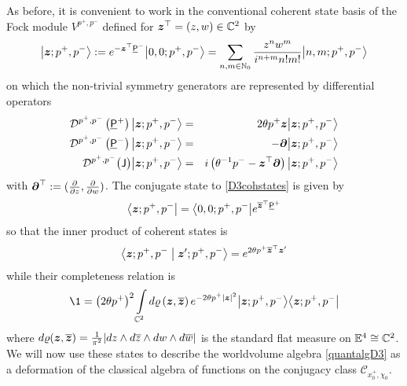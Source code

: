 As before, it is convenient to work in the conventional coherent state basis of
the Fock module $V^{p^+,p^-}$ defined for ${{\boldsymbol {z} }}^\top=(z,w)\in{\mathbb C}^2$ by
\begin{equation}
  \label{D3cohstates}
  \bigl|{{\boldsymbol {z} }};p^+,p^-\bigr\rangle:= e^{-{{\boldsymbol {z} }}^\top \underline{\sf P}{}^-}
  \bigl|0,0;p^+,p^-\bigr\rangle=\sum_{n,m\in{\mathbb N}_0}
  \frac{z^n w^m}{ i^{n+m} n! m!} \bigl|n,m;p^+,p^-
  \bigr\rangle
\end{equation}
on which the non-trivial symmetry generators are represented by differential
operators
\begin{eqnarray}
  \label{symactioncohD3}
  {\mathcal D}^{p^+,p^-}\left( \underline{\sf P}{}^+\right)\bigl|{{\boldsymbol {z} }};p^+,p^-\bigr\rangle&=&
  2\theta p^+ {{\boldsymbol {z} }} \bigl|{{\boldsymbol {z} }};p^+,p^-\bigr\rangle\\\nonumber
  {\mathcal D}^{p^+,p^-}\left( \underline{\sf P}{}^-\right)\bigl|{{\boldsymbol {z} }};p^+,p^-\bigr\rangle&=&
  -{{\boldsymbol {\partial} }}\bigl|{{\boldsymbol {z} }};p^+,p^-\bigr\rangle \\\nonumber
  {\mathcal D}^{p^+,p^-}\bigl({\sf J} \bigr)\bigl|{{\boldsymbol {z} }};p^+,p^-\bigr\rangle&=&
  i\left(\theta^{-1} p^--{{\boldsymbol {z} }}^\top {{\boldsymbol {\partial} }}\right)
  \bigl|{{\boldsymbol {z} }};p^+,p^-\bigr\rangle
\end{eqnarray}
with ${{\boldsymbol {\partial} }}^\top:=(\frac\partial{\partial z},\frac\partial{\partial
  w})$. The conjugate state to \eqref{D3cohstates} is given by
\begin{equation}
  \label{conjD3cohstates}
  \bigl\langle{{\boldsymbol {z} }};p^+,p^-\bigr|=\bigl\langle0,0;p^+,p^-\bigr|
  e^{\overline{{{\boldsymbol {z} }}}{}^{ \top} \underline{\sf P}{}^+}
\end{equation}
so that the inner product of coherent states is
\begin{equation}
  \label{innprodcohD3}
  \bigl\langle{{\boldsymbol {z} }};p^+,p^-\bigm|{{\boldsymbol {z} }}';p^+,p^-\bigr\rangle=
  e^{2\theta p^+ \overline{{{\boldsymbol {z} }}}{}^{ \top} {{\boldsymbol {z} }}'}
\end{equation}
while their completeness relation is
\begin{equation}
  \label{D3complrel}
  \1 = \left(2\theta p^+\right)^2 \int\limits_{\C^2}
  d\varrho\left(\mz,\overline{\mz} \right)  e^{-2\theta p^+ |\mz|^2} 
  \bigl|\mz;p^+,p^-\bigr\rangle\bigl\langle\mz;p^+,p^-\bigr|
\end{equation}
where $ d\varrho({{\boldsymbol {z} }},\overline{{{\boldsymbol {z} }}} )=\frac1{\pi^2} | d z\wedge
d\overline{z}\wedge d w\wedge d\overline{w} |$ is the standard flat measure on
${\mathbb E}^4\cong{\mathbb C}^2$. We will now use these states to describe the
worldvolume algebra \eqref{quantalgD3} as a deformation of the classical algebra
of functions on the conjugacy class $\mathcal{C}_{x_0^+,\chi_0}$.

